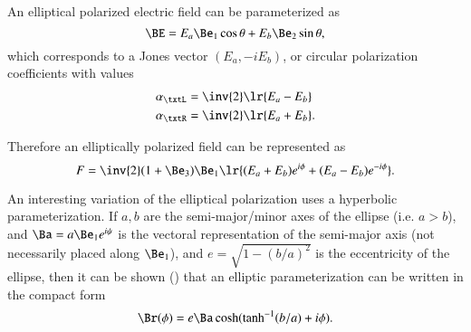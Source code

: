 %
%
An elliptical polarized electric field can be parameterized as
\begin{dmath}\label{eqn:polarization_elliptical:340}
\BE
=
E_a \Be_1 \cos\theta + E_b \Be_2 \sin\theta,
\end{dmath}
which corresponds to a Jones vector \( (E_a, -i E_b) \), or circular polarization coefficients with values
\begin{dmath}\label{eqn:polarization_elliptical:400}
\begin{aligned}
\alpha_\txtL &= \inv{2}\lr{ E_a - E_b } \\
\alpha_\txtR &= \inv{2}\lr{ E_a + E_b }.
\end{aligned}
\end{dmath}

Therefore an elliptically polarized field can be represented as
\begin{dmath}\label{eqn:polarization_elliptical:420}
F = \inv{2} (1 + \Be_3) \Be_1 \lr{ (E_a + E_b) e^{i\phi} + (E_a - E_b) e^{-i\phi} }.
\end{dmath}

An interesting variation of the elliptical polarization uses a hyperbolic parameterization.
If \( a, b \) are the semi-major/minor axes of the ellipse (i.e. \( a > b \)),
and \( \Ba = a \Be_1 e^{i\psi} \) is the vectoral representation of the semi-major axis (not necessarily placed along \( \Be_1 \)),
and \( e = \sqrt{1 - (b/a)^2} \) is the eccentricity of the ellipse,
then it can be shown (\citep{hestenes1999nfc})
that an elliptic parameterization can be written
in the compact form
\begin{dmath}\label{eqn:polarization_elliptical:360}
\Br(\phi)
=
e \Ba \cosh( \tanh^{-1}(b/a) + i \phi).
\end{dmath}


